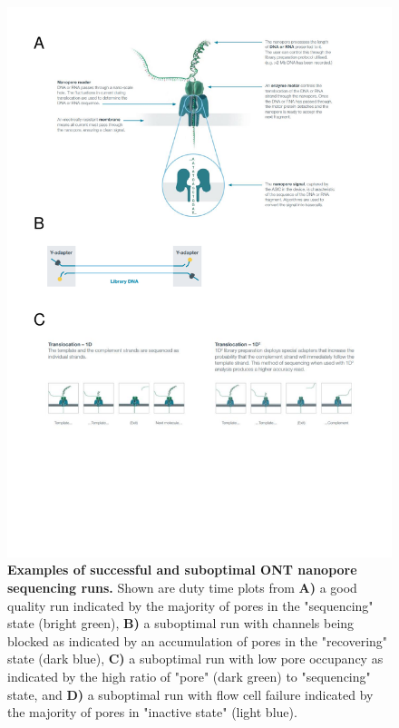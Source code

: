 \begin{figure}[]
	\centering
	\includegraphics[page=6,trim={0 14cm 0 0 },clip, scale = 0.8]{Figures/ProjectDevelopment_FiguresONT}
	\captionsetup{width=0.95\textwidth}
	\caption[Examples of successful and suboptimal ONT nanopore sequencing runs]%
	{\textbf{Examples of successful and suboptimal ONT nanopore sequencing runs.} Shown are duty time plots from \textbf{A)} a good quality run indicated by the majority of pores in the "sequencing" state (bright green), \textbf{B)} a suboptimal run with channels being blocked as indicated by an accumulation of pores in the "recovering" state (dark blue), \textbf{C)} a suboptimal run with low pore occupancy as indicated by the high ratio of "pore" (dark green) to "sequencing" state, and \textbf{D)} a suboptimal run with flow cell failure indicated by the majority of pores in "inactive state" (light blue). 
}
\end{figure}
